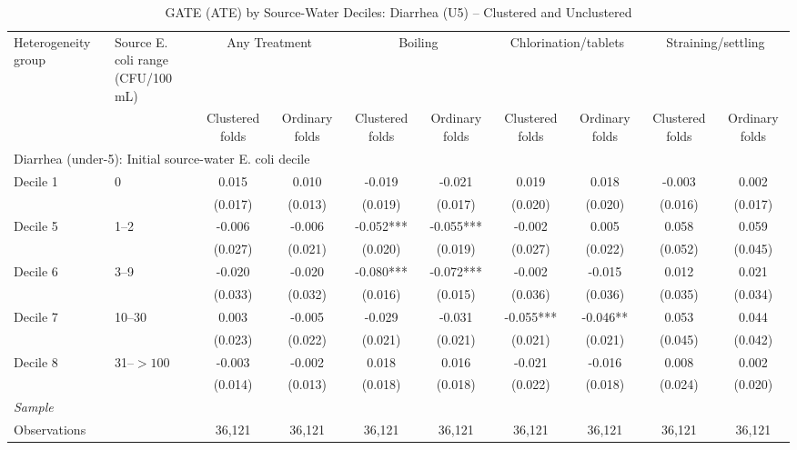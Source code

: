 \begin{landscape}
\begin{table}[p]
\centering
\caption{GATE (ATE) by Source-Water Deciles: Diarrhea (U5) -- Clustered and Unclustered}
\label{tab:table_gate_appendix_deciles-diarrhea}
\scriptsize\setlength{\tabcolsep}{4pt}
\begin{adjustbox}{max width=\linewidth, center}
\begin{tabular}{llcccccccc}
\toprule
Heterogeneity group & \shortstack{Source E. coli range\\(CFU/100 mL)} & \multicolumn{2}{c}{Any Treatment} & \multicolumn{2}{c}{Boiling} & \multicolumn{2}{c}{Chlorination/tablets} & \multicolumn{2}{c}{Straining/settling} \\
 &  & Clustered folds & Ordinary folds & Clustered folds & Ordinary folds & Clustered folds & Ordinary folds & Clustered folds & Ordinary folds \\
\midrule
\multicolumn{10}{l}{Diarrhea (under-5): Initial source-water E. coli decile} \\
Decile 1 & 0 & 0.015 & 0.010 & -0.019 & -0.021 & 0.019 & 0.018 & -0.003 & 0.002 \\
 &  & (0.017) & (0.013) & (0.019) & (0.017) & (0.020) & (0.020) & (0.016) & (0.017) \\
Decile 5 & 1--2 & -0.006 & -0.006 & -0.052*** & -0.055*** & -0.002 & 0.005 & 0.058 & 0.059 \\
 &  & (0.027) & (0.021) & (0.020) & (0.019) & (0.027) & (0.022) & (0.052) & (0.045) \\
Decile 6 & 3--9 & -0.020 & -0.020 & -0.080*** & -0.072*** & -0.002 & -0.015 & 0.012 & 0.021 \\
 &  & (0.033) & (0.032) & (0.016) & (0.015) & (0.036) & (0.036) & (0.035) & (0.034) \\
Decile 7 & 10--30 & 0.003 & -0.005 & -0.029 & -0.031 & -0.055*** & -0.046** & 0.053 & 0.044 \\
 &  & (0.023) & (0.022) & (0.021) & (0.021) & (0.021) & (0.021) & (0.045) & (0.042) \\
Decile 8 & 31--$>100$ & -0.003 & -0.002 & 0.018 & 0.016 & -0.021 & -0.016 & 0.008 & 0.002 \\
 &  & (0.014) & (0.013) & (0.018) & (0.018) & (0.022) & (0.018) & (0.024) & (0.020) \\
\multicolumn{10}{l}{\textit{Sample}} \\
\quad Observations &  & 36,121 & 36,121 & 36,121 & 36,121 & 36,121 & 36,121 & 36,121 & 36,121 \\

\end{tabular}
\end{adjustbox}
\end{table}
\end{landscape}
